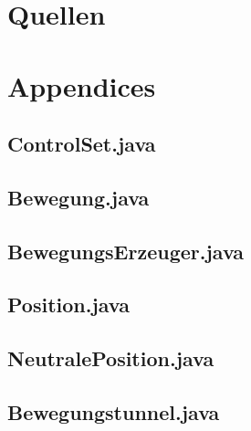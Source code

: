 \documentclass[11pt,a4paper,oneside]{article}
\begin{document}
\section{Quellen}


\section{Appendices}
\subsection*{ControlSet.java}
\subsection*{Bewegung.java}
\subsection*{BewegungsErzeuger.java}
\subsection*{Position.java}
\subsection*{NeutralePosition.java}
\subsection*{Bewegungstunnel.java}
\end{document}
